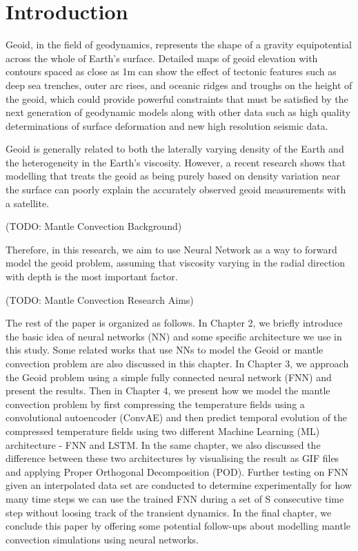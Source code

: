 \chapter{Introduction}

Geoid, in the field of geodynamics, represents the shape of a gravity equipotential across the whole of Earth's surface. Detailed maps of geoid elevation with contours spaced as close as 1m can show the effect of tectonic features such as deep sea trenches, outer arc rises, and oceanic ridges and troughs on the height of the geoid, which could provide powerful constraints that must be satisfied by the next generation of geodynamic models along with other data such as high quality determinations of surface deformation and new high resolution seismic data. \citep{10.1038_299104a0}

Geoid is generally related to both the laterally varying density of the Earth and the heterogeneity in the Earth's viscosity. However, a recent research shows that modelling that treats the geoid as being purely based on density variation near the surface can poorly explain the accurately observed geoid measurements with a satellite. \cite{10.1098_rsta.1989.0038}

(TODO: Mantle Convection Background)

Therefore, in this research, we aim to use Neural Network as a way to forward model the geoid problem,
assuming that viscosity varying in the radial direction with depth is the most important factor.

(TODO: Mantle Convection Research Aims)

The rest of the paper is organized as follows. In Chapter 2, we briefly introduce the basic idea of neural networks (NN) and some specific architecture we use in this study. Some related works that use NNs to model the Geoid or mantle convection problem are also discussed in this chapter. In Chapter 3, we approach the Geoid problem using a simple fully connected neural network (FNN) and present the results. Then in Chapter 4, we present how we model the mantle convection problem by first compressing the temperature fields using a convolutional autoencoder (ConvAE) and then predict temporal evolution of the compressed temperature fields using two different Machine Learning (ML) architecture - FNN and LSTM. In the same chapter, we also discussed the difference between these two architectures by visualising the result as GIF files and applying Proper Orthogonal Decomposition (POD). Further testing on FNN given an interpolated data set are conducted to determine experimentally for how many time steps we can use the trained FNN during
a set of S consecutive time step without loosing track of the transient dynamics. In the final chapter, we conclude this paper by offering some potential follow-ups about modelling mantle convection simulations using neural networks.



